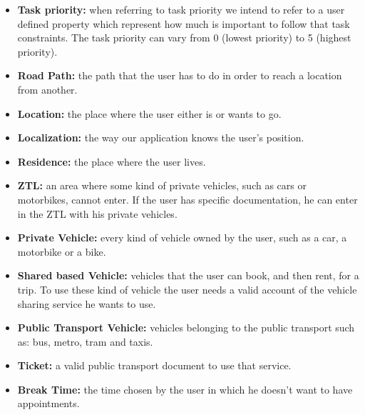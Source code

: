 \begin{itemize}
     \item \textbf{Task priority:} when referring to task priority we intend to refer to a user defined property which represent how much is important to follow that task constraints. The task priority can vary from 0 (lowest priority) to 5 (highest priority).
     
    \item \textbf{Road Path:} the path that the user has to do in order to reach a location from another.
    
    \item \textbf{Location:} the place where the user either is or wants to go.
    
    \item \textbf{Localization:} the way our application knows the user's position.
    
    \item \textbf{Residence:} the place where the user lives.
    
    \item \textbf{ZTL:} an area where some kind of private vehicles, such as cars or motorbikes, cannot enter. If the user has specific documentation, he can enter in the ZTL with his private vehicles.
    
    \item \textbf{Private Vehicle:} every kind of vehicle owned by the user, such as a car, a motorbike or a bike.
    
    \item \textbf{Shared based Vehicle:} vehicles that the user can book, and then rent, for a trip. To use these kind of vehicle the user needs a valid account of the vehicle sharing service he wants to use.
    
    \item \textbf{Public Transport Vehicle:} vehicles belonging to the public transport such as: bus, metro, tram and taxis.
        
    \item \textbf{Ticket:} a valid public transport document to use that service.
    
    \item \textbf{Break Time:} the time chosen by the user in which he doesn't want to have appointments.
    

\end{itemize}
